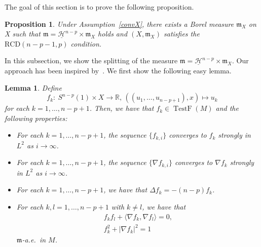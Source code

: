 \documentclass[pdftex]{sigma}
\numberwithin{equation}{section}
\newtheorem{Prop}[Thm]{Proposition}
\newtheorem{Lem}[Thm]{Lemma}
\theoremstyle{definition}
\newcommand{\TestF}{\operatorname{TestF}}
\newcommand{\R}{\mathbb{R}}
\newcommand{\mf}{\mathfrak{m}}
\newcommand{\nHa}{\underline{\mathcal{H}}}
\begin{document}
The goal of this section is to prove the following proposition.
\begin{Prop}\label{strX}
Under Assumption~{\rm \ref{convX}}, there exists a Borel measure $\mf_X$ on X such that $\mf=\nHa^{n-p}\times \mf_X$ holds and $(X,\mf_X)$ satisfies the $\mathrm{RCD}(n-p-1,p)$ condition.
\end{Prop}
In this subsection, we show the splitting of the measure $\mf=\nHa^{n-p}\times \mf_X$.
Our approach has been inspired by~\cite{GR2018}.
We first show the following easy lemma.
\begin{Lem}\label{hfun}
Define
\[
f_k\colon\ S^{n-p}(1)\times X\to \R,\, ((u_1,\ldots,u_{n-p+1}),x)\mapsto u_k
\]
for each $k=1,\ldots, n-p+1$.
Then, we have that $f_k \in\TestF(M)$ and the following properties:
\begin{itemize}\itemsep=0pt
\item[$(i)$] For each $k=1,\ldots,n-p+1$, the sequence $\{f_{k,i}\}$ converges to $f_k$ strongly in $L^2$ as $i\to\infty$.
\item[$(ii)$] For each $k=1,\ldots,n-p+1$, the sequence $\{\nabla f_{k,i}\}$ converges to $\nabla f_k$ strongly in $L^2$ as $i\to\infty$.
\item[$(iii)$] For each $k=1,\ldots,n-p+1$, we have that $\Delta f_k= -(n-p)f_k$.
\item[$(iv)$] For each $k,l=1,\ldots,n-p+1$ with $k\neq l$, we have that
\begin{gather*}
f_k f_l +\langle\nabla f_k,\nabla f_l\rangle=0,
\\
f_k^2+|\nabla f_k|^2=1
\end{gather*}
$\mf$-a.e.\ in $M$.
\end{itemize}
\end{Lem}
\end{document}
